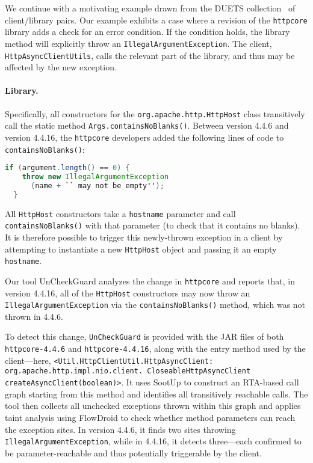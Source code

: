 We continue with a motivating example drawn from the DUETS collection~\cite{durieux21:_duets}
of client/library pairs. 
Our example exhibits a case
where a revision of the \texttt{httpcore} library adds a check for an
error condition.  If the condition holds, the library method will
explicitly throw an \texttt{IllegalArgumentException}. The client, \texttt{HttpAsyncClientUtils},
calls the relevant part of the library, and thus may be affected by the new exception.

\paragraph{Library.} Specifically, all constructors for the \texttt{org.apache.http.HttpHost} class transitively call
the static method \texttt{Args.containsNoBlanks()}. Between version 4.4.6 and version 4.4.16, the \texttt{httpcore}
developers added the following lines of code to \texttt{containsNoBlanks()}:
\begin{lstlisting}[language=Java]
  if (argument.length() == 0) {
    throw new IllegalArgumentException
      (name + `` may not be empty'');
  }
\end{lstlisting}
All \texttt{HttpHost} constructors take a \texttt{hostname} parameter and call \texttt{containsNoBlanks()}
with that parameter (to check that it contains no blanks). It is therefore possible to trigger this newly-thrown
exception in a client by attempting to instantiate a new \texttt{HttpHost} object and passing it an empty
\texttt{hostname}.

Our tool UnCheckGuard analyzes the change in \texttt{httpcore} and reports that, in
version 4.4.16, all of the \texttt{HttpHost} constructors may now throw an
\texttt{IllegalArgumentException} via the \texttt{containsNoBlanks()} method, which
was not thrown in 4.4.6.

To detect this change, \texttt{UnCheckGuard} is provided with the JAR files of both \texttt{httpcore-4.4.6} and \texttt{httpcore-4.4.16}, along with the entry method used by the client—here, \texttt{<Util.HttpClientUtil.HttpAsyncClient: org.apache.http.impl.nio.client. CloseableHttpAsyncClient createAsyncClient(boolean)>}. It uses SootUp\cite{Karakaya24:_sootup} to construct an RTA-based call graph starting from this method and identifies all transitively reachable calls. The tool then collects all unchecked exceptions thrown within this graph and applies taint analysis using FlowDroid\cite{Arzt14:_flowdroid} to check whether method parameters can reach the exception sites. In version 4.4.6, it finds two sites throwing \texttt{IllegalArgumentException}, while in 4.4.16, it detects three—each confirmed to be parameter-reachable and thus potentially triggerable by the client.

